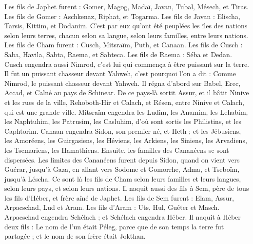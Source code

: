 \begin{multicols}{2}
Les fils de Japhet furent : Gomer, Magog, Madaï, Javan, Tubal, Mésech, et Tiras.
Les fils de Gomer : Aschkenaz, Riphat, et Togarma.
Les fils de Javan : Elischa, Tarsis, Kittim, et Dodanim.
C’est par eux qu’ont été peuplées les îles des nations selon leurs terres, chacun selon sa langue, selon leurs familles, entre leurs nations.
Les fils de Cham furent : Cusch, Mitsraïm, Puth, et Canaan.
Les fils de Cusch : Saba, Havila, Sabta, Raema, et Sabteca. Les fils de Raema : Séba et Dedan.
Cusch engendra aussi Nimrod, c’est lui qui commença à être puissant sur la terre.
Il fut un puissant chasseur devant Yahweh, c'est pourquoi l'on a dit : Comme Nimrod, le puissant chasseur devant Yahweh.
Il régna d’abord sur Babel, Erec, Accad, et Calné au pays de Schinear.
De ce pays-là sortit Assur, et il bâtit Ninive et les rues de la ville, Rehoboth-Hir et Calach,
et Résen, entre Ninive et Calach, qui est une grande ville.
Mitsraïm engendra les Ludim, les Anamim, les Lehabim, les Naphtuhim,
les Patrusim, les Casluhim, d’où sont sortis les Philistins, et les Caphtorim.
Canaan engendra Sidon, son premier-né, et Heth ;
et les Jébusiens, les Amoréens, les Guirgasiens,
les Héviens, les Arkiens, les Siniens,
les Arvadiens, les Tsemariens, les Hamathiens. Ensuite, les familles des Cananéens se sont dispersées.
Les limites des Cananéens furent depuis Sidon, quand on vient vers Guérar, jusqu'à Gaza, en allant vers Sodome et Gomorrhe, Adma, et Tseboïm, jusqu'à Léscha.
Ce sont là les fils de Cham selon leurs familles et leurs langues, selon leurs pays, et selon leurs nations.
Il naquit aussi des fils à Sem, père de tous les fils d'Héber, et frère aîné de Japhet.
Les fils de Sem furent : Elam, Assur, Arpacschad, Lud et Aram.
Les fils d'Aram : Uts, Hul, Guéter et Masch.
Arpacschad engendra Schélach ; et Schélach engendra Héber.
Il naquit à Héber deux fils : Le nom de l'un était Péleg, parce que de son temps la terre fut partagée ; et le nom de son frère était Jokthan.

\end{multicols}
